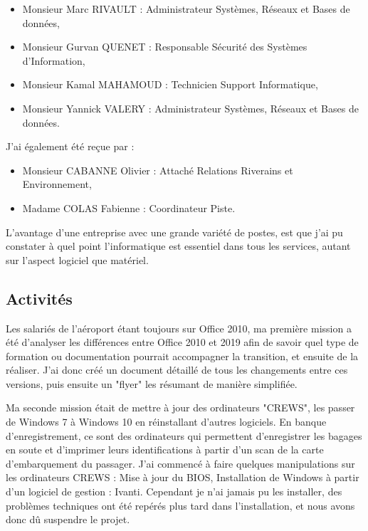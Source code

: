 \begin{itemize}
    \item Monsieur Marc RIVAULT : Administrateur Systèmes, Réseaux et Bases de données,
    \item Monsieur Gurvan QUENET : Responsable Sécurité des Systèmes d'Information,
    \item Monsieur Kamal MAHAMOUD : Technicien Support Informatique,
    \item Monsieur Yannick VALERY : Administrateur Systèmes, Réseaux et Bases de données.
\end{itemize}

J'ai également été reçue par :

\begin{itemize}
    \item Monsieur CABANNE Olivier : Attaché Relations Riverains et Environnement,
    \item Madame COLAS Fabienne : Coordinateur Piste.
\end{itemize}


L'avantage d'une entreprise avec une grande variété de postes, est que j'ai pu constater à quel point l'informatique est essentiel dans tous les services, autant sur l'aspect logiciel que matériel.

\subsection{Activités}

Les salariés de l'aéroport étant toujours sur Office 2010, ma première mission a été d'analyser les différences entre Office 2010 et 2019 afin de savoir quel type de formation ou documentation pourrait accompagner la transition, et ensuite de la réaliser.
J'ai donc créé un document détaillé de tous les changements entre ces versions, puis ensuite un "flyer" les résumant de manière simplifiée.\newline

Ma seconde mission était de mettre à jour des ordinateurs "CREWS", les passer de Windows 7 à Windows 10 en réinstallant d'autres logiciels. En banque d'enregistrement, ce sont des ordinateurs qui permettent d'enregistrer les bagages en soute et d'imprimer leurs identifications à partir d'un scan de la carte d'embarquement du passager.
J'ai commencé à faire quelques manipulations sur les ordinateurs CREWS : Mise à jour du BIOS, Installation de Windows à partir d'un logiciel de gestion : Ivanti.
Cependant je n'ai jamais pu les installer, des problèmes techniques ont été repérés plus tard dans l'installation, et nous avons donc dû suspendre le projet.\newline

